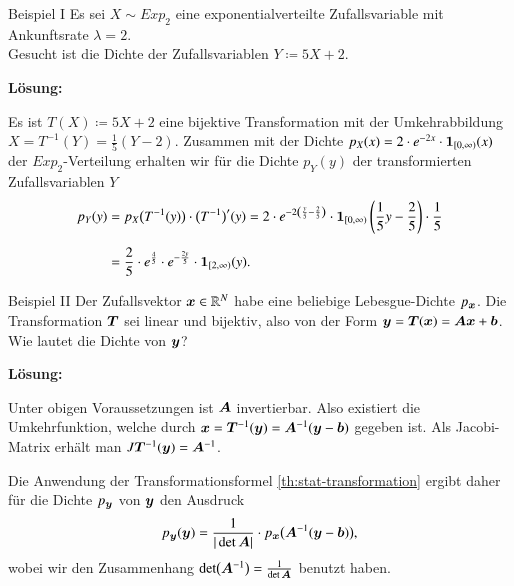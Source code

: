 \begin{frame}{Beispiel I}{}
	Es sei $X \sim Exp_2$ eine exponentialverteilte Zufallsvariable mit Ankunftsrate $\lambda = 2$. \\
	Gesucht ist die Dichte der Zufallsvariablen $Y \coloneqq 5X + 2$.
	
	\begin{boxGray}
		\textbf{Lösung:}
		
		Es ist $T(X) \coloneqq 5X + 2$ eine bijektive Transformation mit der Umkehrabbildung
		$X = T^{-1}(Y) = \frac{1}{5}(Y - 2)$.
		Zusammen mit der Dichte $p_X(x) = 2 \cdot e^{-2 x} \cdot \bm{1}_{[0, \infty)}(x)$ der $Exp_2$-Verteilung
		erhalten wir für die Dichte $p_Y(y)$ der transformierten Zufallsvariablen $Y$
		\begin{align*}
			p_Y(y)
				&= p_X\bigl( T^{-1}(y) \bigr) \cdot \bigl( T^{-1} \bigr)'(y)
					= 2 \cdot e^{-2 \left( \frac{y}{5} - \frac{2}{5} \right)}
						\cdot \bm{1}_{[0, \infty)}\left(\frac{1}{5} y - \frac{2}{5} \right) \cdot \frac{1}{5}
		\\[2mm]
				&= \frac{2}{5} \cdot e^{\frac{4}{5}} \cdot e^{-\frac{2 y}{5}} \cdot \bm{1}_{[2, \infty)}(y).
		\end{align*}
	\end{boxGray}
\end{frame}


\begin{frame}{Beispiel II}{}
	Der Zufallsvektor $\bm{x} \in \mathbb{R}^N$ habe eine beliebige Lebesgue-Dichte $p_{\bm{x}}$. Die Transformation $\bm{T}$ sei linear und bijektiv,
	also von der Form $\bm{y} = \bm{T}(\bm{x}) = \bm{A} \bm{x} + \bm{b}$. Wie lautet die Dichte von $\bm{y}$?
	
	\begin{boxGray}
		\textbf{Lösung:}
		
		Unter obigen Voraussetzungen ist $\bm{A}$ invertierbar. Also existiert die Umkehrfunktion, welche durch
		$\bm{x} = \bm{T}^{-1}(\bm{y}) = \bm{A}^{-1} (\bm{y} - \bm{b})$ gegeben ist. Als Jacobi-Matrix erhält man $J\bm{T}^{-1}(\bm{y}) = \bm{A}^{-1}$.
		
		Die Anwendung der Transformationsformel \ref{th:stat-transformation} ergibt daher für die Dichte $p_{\bm{y}}$ von $\bm{y}$
		den Ausdruck
		\begin{equation*}
			p_{\bm{y}}(\bm{y}) = \frac{1}{\vert \det \bm{A} \vert} \cdot p_{\bm{x}}\bigl( \bm{A}^{-1} (\bm{y} - \bm{b}) \bigr),
		\end{equation*}
		wobei wir den Zusammenhang $\det\bigl( \bm{A}^{-1} \bigr) = \frac{1}{\det \bm{A}}$ benutzt haben.
	\end{boxGray}
\end{frame}


